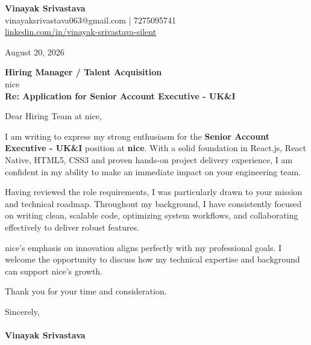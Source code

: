 \documentclass[11pt,a4paper]{article}
\begin{document}
\thispagestyle{empty}

{\Large \textbf{Vinayak Srivastava}}\\
vinayaksrivastava063@gmail.com | 7275095741 \\
\url{linkedin.com/in/vinayak-srivastava-silent}

\vspace{1em}
\hfill August 20, 2026

\textbf{Hiring Manager / Talent Acquisition}\\
nice\\

\vspace{1.5em}
\textbf{Re: Application for Senior Account Executive - UK&I}

\vspace{1em}
Dear Hiring Team at nice,

I am writing to express my strong enthusiasm for the \textbf{Senior Account Executive - UK&I} position at \textbf{nice}. With a solid foundation in React.js, React Native, HTML5, CSS3 and proven hands-on project delivery experience, I am confident in my ability to make an immediate impact on your engineering team.

Having reviewed the role requirements, I was particularly drawn to your mission and technical roadmap. Throughout my background, I have consistently focused on writing clean, scalable code, optimizing system workflows, and collaborating effectively to deliver robust features.

nice's emphasis on innovation aligns perfectly with my professional goals. I welcome the opportunity to discuss how my technical expertise and background can support nice's growth.

Thank you for your time and consideration.

\vspace{1.5em}
Sincerely,\\
\vspace{1em}\\
\textbf{Vinayak Srivastava}
\end{document}
